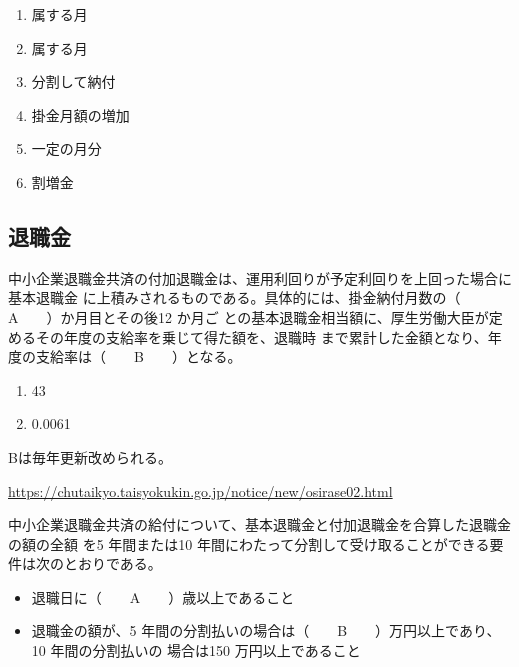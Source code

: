 \begin{answerbox}
  \begin{enumerate}[A:]
    \item 属する月
    \item 属する月
    \item 分割して納付
    \item 掛金月額の増加
    \item 一定の月分
    \item 割増金
  \end{enumerate}
\end{answerbox}

\newpage

\subsection{退職金}


\begin{fillblank}[年金1 2021 問題1(6)\textcircled{1}（改題）]
中小企業退職金共済の付加退職金は、運用利回りが予定利回りを上回った場合に基本退職金
に上積みされるものである。具体的には、掛金納付月数の（　　A　　）か月目とその後12 か月ご
との基本退職金相当額に、厚生労働大臣が定めるその年度の支給率を乗じて得た額を、退職時
まで累計した金額となり、\warekiyear 年度の支給率は（　　B　　）となる。
\end{fillblank}

\begin{answerbox}
  \begin{enumerate}[A:]
    \item 43
    \item 0.0061 %
  \end{enumerate}
\end{answerbox}

\begin{explanationbox}
Bは毎年更新改められる。

\url{https://chutaikyo.taisyokukin.go.jp/notice/new/osirase02.html}
\end{explanationbox}

\begin{fillblank}[年金1 2020 問題1(6)]
中小企業退職金共済の給付について、基本退職金と付加退職金を合算した退職金の額の全額
を5 年間または10 年間にわたって分割して受け取ることができる要件は次のとおりである。
\begin{itemize}
  \item 退職日に（　　A　　）歳以上であること
\item 退職金の額が、5 年間の分割払いの場合は（　　B　　）万円以上であり、10 年間の分割払いの
場合は150 万円以上であること
\end{itemize}

\end{fillblank}


